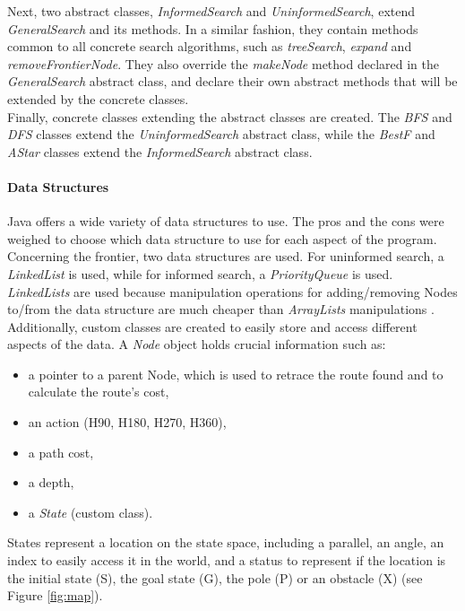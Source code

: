 \documentclass[letterpaper,12pt]{article}
\begin{document}
Next, two abstract classes, \textit{InformedSearch} and \textit{UninformedSearch}, extend \textit{GeneralSearch} and its methods. In a similar fashion, they contain methods common to all concrete search algorithms, such as \textit{treeSearch}, \textit{expand} and \textit{removeFrontierNode}. They also override the \textit{makeNode} method declared in the \textit{GeneralSearch} abstract class, and declare their own abstract methods that will be extended by the concrete classes.\\

Finally, concrete classes extending the abstract classes are created. The \textit{BFS} and \textit{DFS} classes extend the \textit{UninformedSearch} abstract class, while the \textit{BestF} and \textit{AStar} classes extend the \textit{InformedSearch} abstract class.

\paragraph{Data Structures}

Java offers a wide variety of data structures to use. The pros and the cons were weighed to choose which data structure to use for each aspect of the program. Concerning the frontier, two data structures are used. For uninformed search, a \textit{LinkedList} is used, while for informed search, a \textit{PriorityQueue} is used. \textit{LinkedLists} are used because manipulation operations for adding/removing Nodes to/from the data structure are much cheaper than \textit{ArrayLists} manipulations \cite{diffLLAL}.\\

Additionally, custom classes are created to easily store and access different aspects of the data. A \textit{Node} object holds crucial information such as:
\begin{itemize}
    \item a pointer to a parent Node, which is used to retrace the route found and to calculate the route's cost,
    \item an action (H90, H180, H270, H360),
    \item a path cost,
    \item a depth,
    \item a \textit{State} (custom class).
\end{itemize}

States represent a location on the state space, including a parallel, an angle, an index to easily access it in the world, and a status to represent if the location is the initial state (S), the goal state (G), the pole (P) or an obstacle (X) (see Figure \ref{fig:map}).
\end{document}
